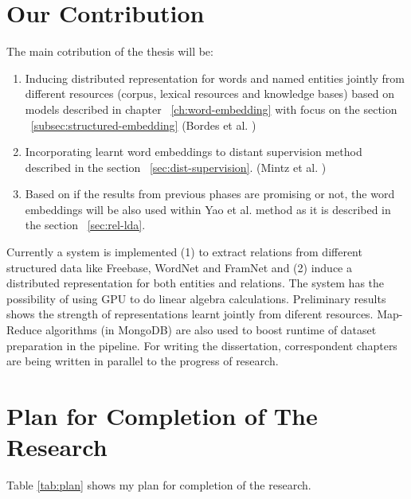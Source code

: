 \documentclass[12pt]{report}
\begin{document}
\section{Our Contribution}
\label{sec:contr}

The main cotribution of the thesis will be: 
\begin{enumerate}
\item Inducing distributed
representation for words and named entities jointly from different resources
(corpus, lexical resources and knowledge bases) based on models described in
chapter ~\ref{ch:word-embedding} with focus on the section
~\ref{subsec:structured-embedding} (Bordes et al. \cite{Bordes2011}) 

\item Incorporating learnt word embeddings to distant supervision method
described in the section ~\ref{sec:dist-supervision}. (Mintz et al.
\cite{Mintz2009})

\item Based on if the results from previous phases are promising or not, the
word embeddings will be also used within Yao et al. method \cite{Yao2011} as it is
described in the section ~\ref{sec:rel-lda}.

\end{enumerate}

Currently a system is implemented (1) to extract relations from different
structured data like Freebase, WordNet and FramNet and (2) induce a distributed
representation for both entities and relations. The system has the possibility of using GPU to
do linear algebra calculations. Preliminary results shows the strength of
representations learnt jointly from diferent resources. Map-Reduce algorithms
(in MongoDB) are also used to boost runtime of dataset preparation in the
pipeline. For writing the dissertation, correspondent chapters are being written
in parallel to the progress of research. 




\section{Plan for Completion of The Research}
\label{sec:plan}

Table \ref{tab:plan} shows my plan for completion of the research.
\end{document}
